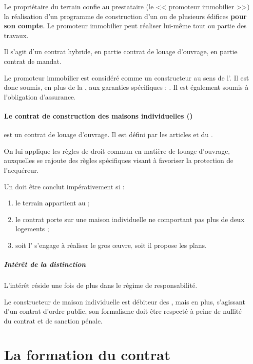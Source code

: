 				Le propriétaire du terrain confie au prestataire (le << promoteur immobilier >>) la réalisation d'un programme de construction d'un ou de plusieurs édifices \textbf{pour son compte}. Le promoteur immobilier peut réaliser lui-même tout ou partie des travaux.

				Il s'agit d'un contrat hybride, en partie contrat de louage d'ouvrage, en partie contrat de mandat.

				Le promoteur immobilier est considéré comme un constructeur au sens de l'. Il est donc soumis, en plus de la \rcdc, aux garanties spécifiques : \lesGarSpec. Il est également soumis à l'obligation d'assurance.

				\paragraph{Le contrat de construction des maisons individuelles (\CCMI)}

					est un contrat de louage d'ouvrage. Il est défini par les articles  et  du \cch.

					On lui applique les règles de droit commun en matière de louage d'ouvrage, auxquelles se rajoute des règles spécifiques visant à favoriser la protection de l'acquéreur.

					Un \ccmi{} doit être conclut impérativement si :
					\begin{enumerate}
						\item le terrain appartient au \Mo{} ;
						\item le contrat porte sur une maison individuelle ne comportant pas plus de deux logements ;
						\item soit l'\E{} s'engage à réaliser le gros œuvre, soit il propose les plans.
					\end{enumerate}

					\subparagraph{Intérêt de la distinction}

					L'intérêt réside une fois de plus dans le régime de responsabilité.

					Le constructeur de maison individuelle est débiteur des \garSpec{}, mais en plus, s'agissant d'un contrat d'ordre public, son formalisme doit être respecté à peine de nullité du contrat et de sanction pénale.

	\section{La formation du contrat}

